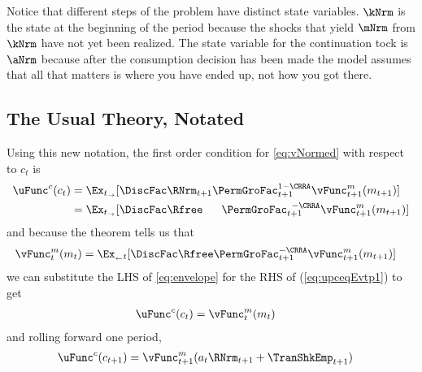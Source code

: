 Notice that different steps of the problem have distinct state variables.  $\kNrm$ is the state at the beginning of the period because the shocks that yield $\mNrm$ from $\kNrm$ have not yet been realized. The state variable for the continuation {tock} is $\aNrm$ because after the consumption decision has been made the model assumes that all that matters is where you have ended up, not how you got there.

\subsection{The Usual Theory, Notated}

Using this new notation, the first order condition for \eqref{eq:vNormed} with respect to ${c}_{t}$ is
\begin{equation}\begin{gathered}\begin{aligned}
      \uFunc^{{c}}({c}_{t})  & = \Ex_{t_\rightarrow}[\DiscFac \RNrm_{t+1}\PermGroFac_{t+1}^{1-\CRRA}{\vFunc}^{{m}}_{{t+1}}({m}_{t+1})]  \label{eq:upceqEvtp1}
      \\                        & =  \Ex_{t_\rightarrow}[\DiscFac\Rfree\phantom{._{t+1}}\PermGroFac_{t+1}^{\phantom{1}-\CRRA}{\vFunc}^{{m}}_{{t+1}}({m}_{t+1})]
    \end{aligned}\end{gathered}\end{equation}
and because the  theorem tells us that
\begin{equation}\begin{gathered}\begin{aligned}
      {\vFunc}^{{m}}_{{t}}({m}_{t})  & =  \Ex_{_\leftarrow t} [\DiscFac\Rfree\PermGroFac_{t+1}^{-\CRRA}{\vFunc}^{{m}}_{{t+1}}({m}_{t+1})] \label{eq:envelope}
    \end{aligned}\end{gathered}\end{equation}
we can substitute the LHS of \eqref{eq:envelope} for the RHS of
(\ref{eq:upceqEvtp1}) to get
  \begin{equation}\begin{gathered}\begin{aligned}
        \uFunc^{{c}}({c}_{t})  & = {\vFunc}^{{m}}_{{t}}({m}_{t})\label{eq:upcteqvtp}
      \end{aligned}\end{gathered}\end{equation}
and rolling forward one {period},
\begin{equation}\begin{gathered}\begin{aligned}
      \uFunc^{{c}}({c}_{t+1})  & = {\vFunc}^{{m}}_{{t+1}}({a}_{t}\RNrm_{t+1}+\TranShkEmp_{t+1}) \label{eq:upctp1EqVpxtp1}
    \end{aligned}\end{gathered}\end{equation}
